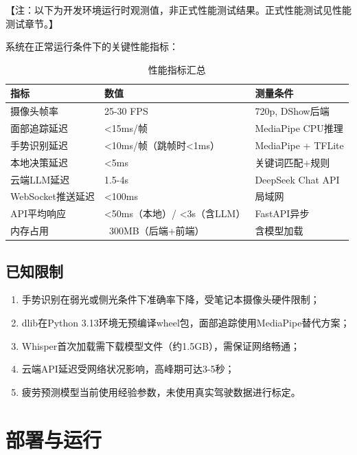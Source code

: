 \documentclass[a4paper]{article}
\begin{document}
{\small\color{gray}【注：以下为开发环境运行时观测值，非正式性能测试结果。正式性能测试见性能测试章节。】}

系统在正常运行条件下的关键性能指标：

\begin{table}[H]
  \centering
  \caption{性能指标汇总}
  \label{tab:perf}
  \begin{tabular}{lll}
  \toprule
  指标 & 数值 & 测量条件 \\
  \midrule
  摄像头帧率 & 25-30 FPS & 720p, DShow后端 \\
  面部追踪延迟 & <15ms/帧 & MediaPipe CPU推理 \\
  手势识别延迟 & <10ms/帧（跳帧时<1ms）& MediaPipe + TFLite \\
  本地决策延迟 & <5ms & 关键词匹配+规则 \\
  云端LLM延迟 & 1.5-4s & DeepSeek Chat API \\
  WebSocket推送延迟 & <100ms & 局域网 \\
  API平均响应 & <50ms（本地）/ <3s（含LLM）& FastAPI异步 \\
  内存占用 & ~300MB（后端+前端）& 含模型加载 \\
  \bottomrule
  \end{tabular}
\end{table}

\subsection{已知限制}

\begin{enumerate}
    \item 手势识别在弱光或侧光条件下准确率下降，受笔记本摄像头硬件限制；
    \item dlib在Python 3.13环境无预编译wheel包，面部追踪使用MediaPipe替代方案；
    \item Whisper首次加载需下载模型文件（约1.5GB），需保证网络畅通；
    \item 云端API延迟受网络状况影响，高峰期可达3-5秒；
    \item 疲劳预测模型当前使用经验参数，未使用真实驾驶数据进行标定。
\end{enumerate}

\section{部署与运行}
\end{document}
